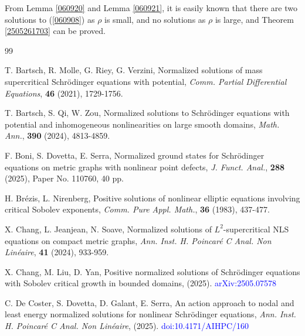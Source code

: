 \documentclass[10pt]{article}
\numberwithin{equation}{section}
\numberwithin{equation}{section}
\begin{document}
 From Lemma \ref{060920} and Lemma \ref{060921},  it is easily known that there are two solutions to (\ref{060908}) as $\rho$ is small, and no solutions as $\rho$ is large, and Theorem \ref{2505261703} can be proved.

%




\begin{thebibliography}{99}

 T. Bartsch, R. Molle, G. Riey, G. Verzini, Normalized solutions of mass supercritical Schr\"{o}dinger equations with potential, {\it Comm. Partial Differential Equations}, {\bf 46}  (2021), 1729-1756.

 T. Bartsch, S. Qi, W. Zou, Normalized solutions to Schr\"{o}dinger equations with potential and inhomogeneous nonlinearities on large smooth domains, {\it Math. Ann.}, {\bf 390} (2024), 4813-4859.

 F. Boni, S. Dovetta, E. Serra, Normalized ground states for Schr\"{o}dinger equations on metric graphs with nonlinear point defects, {\it J. Funct. Anal.}, {\bf 288} (2025), Paper No. 110760, 40 pp.



 H. Br\'{e}zis, L. Nirenberg,  Positive solutions of nonlinear elliptic equations involving critical Sobolev exponents, {\it Comm. Pure Appl. Math.}, {\bf 36} (1983), 437-477.

 X. Chang, L. Jeanjean, N. Soave, Normalized solutions of $L^2$-supercritical NLS equations on compact metric graphs, {\it Ann. Inst. H. Poincar\'{e} C Anal. Non Lin\'{e}aire}, {\bf 41} (2024), 933-959.

 X. Chang, M. Liu, D. Yan, Positive normalized solutions of Schr\"odinger equations with Sobolev critical growth in bounded domains, (2025). \textcolor{blue}{arXiv:2505.07578}

 C. De Coster, S. Dovetta, D. Galant, E. Serra, An action approach to nodal and least energy normalized solutions for nonlinear Schr\"odinger equations, {\it Ann. Inst. H. Poincar\'e C Anal. Non Lin\'eaire}, (2025). \textcolor{blue}{doi:10.4171/AIHPC/160}



\end{thebibliography}
\end{document}
